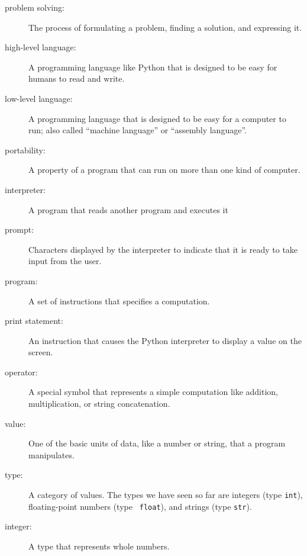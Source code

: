 \documentclass[10pt]{book}
\begin{document}
\begin{description}

\item[problem solving:]  The process of formulating a problem, finding
a solution, and expressing it.

\item[high-level language:]  A programming language like Python that
is designed to be easy for humans to read and write.

\item[low-level language:]  A programming language that is designed
to be easy for a computer to run; also called ``machine language'' or
``assembly language''.

\item[portability:]  A property of a program that can run on more
than one kind of computer.

\item[interpreter:]  A program that reads another program and executes
it

\item[prompt:] Characters displayed by the interpreter to indicate
that it is ready to take input from the user.

\item[program:] A set of instructions that specifies a computation.

\item[print statement:]  An instruction that causes the Python
interpreter to display a value on the screen.

\item[operator:]  A special symbol that represents a simple computation like
addition, multiplication, or string concatenation.

\item[value:]  One of the basic units of data, like a number or string, 
that a program manipulates.

\item[type:] A category of values.  The types we have seen so far
are integers (type {\tt int}), floating-point numbers (type {\tt
float}), and strings (type {\tt str}).

\item[integer:] A type that represents whole numbers.


\end{description}
\end{document}
